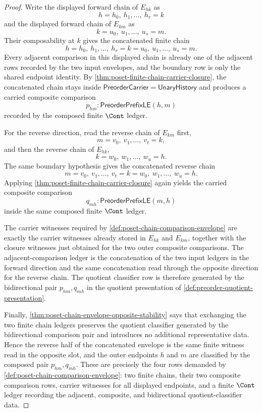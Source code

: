 \begin{proof}
Write the displayed forward chain of $E_{hk}$ as
$$
h=h_0,\ h_1,\ldots,\ h_r=k
$$
and the displayed forward chain of $E_{km}$ as
$$
k=u_0,\ u_1,\ldots,\ u_s=m.
$$
Their composability at $k$ gives the concatenated finite chain
$$
h=h_0,\ h_1,\ldots,\ h_r=k=u_0,\ u_1,\ldots,\ u_s=m.
$$
Every adjacent comparison in this displayed chain is already one of the adjacent rows recorded by the two input envelopes, and the boundary row is only the shared endpoint identity. By \autoref{thm:poset-finite-chain-carrier-closure}, the concatenated chain stays inside $\mathsf{PreorderCarrier}=\mathsf{UnaryHistory}$ and produces a carried composite comparison
$$
p_{hm}:\mathsf{PreorderPrefixLE}(h,m)
$$
recorded by the composed finite $\Cont$ ledger.

For the reverse direction, read the reverse chain of $E_{km}$ first,
$$
m=v_0,\ v_1,\ldots,\ v_t=k,
$$
and then the reverse chain of $E_{hk}$,
$$
k=w_0,\ w_1,\ldots,\ w_u=h.
$$
The same boundary hypothesis gives the concatenated reverse chain
$$
m=v_0,\ v_1,\ldots,\ v_t=k=w_0,\ w_1,\ldots,\ w_u=h.
$$
Applying \autoref{thm:poset-finite-chain-carrier-closure} again yields the carried composite comparison
$$
q_{mh}:\mathsf{PreorderPrefixLE}(m,h)
$$
inside the same composed finite $\Cont$ ledger.

The carrier witnesses required by \autoref{def:poset-chain-comparison-envelope} are exactly the carrier witnesses already stored in $E_{hk}$ and $E_{km}$, together with the closure witnesses just obtained for the two outer composite comparisons. The adjacent-comparison ledger is the concatenation of the two input ledgers in the forward direction and the same concatenation read through the opposite direction for the reverse chain. The quotient classifier row is therefore generated by the bidirectional pair $p_{hm},q_{mh}$ in the quotient presentation of \autoref{def:preorder-quotient-presentation}.

Finally, \autoref{thm:poset-chain-envelope-opposite-stability} says that exchanging the two finite chain ledgers preserves the quotient classifier generated by the bidirectional comparison pair and introduces no additional representative data. Hence the reverse half of the concatenated envelope is the same finite witness read in the opposite slot, and the outer endpoints $h$ and $m$ are classified by the composed pair $p_{hm},q_{mh}$. These are precisely the four rows demanded by \autoref{def:poset-chain-comparison-envelope}: two finite chains, their two composite comparison rows, carrier witnesses for all displayed endpoints, and a finite $\Cont$ ledger recording the adjacent, composite, and bidirectional quotient-classifier data.
\end{proof}
